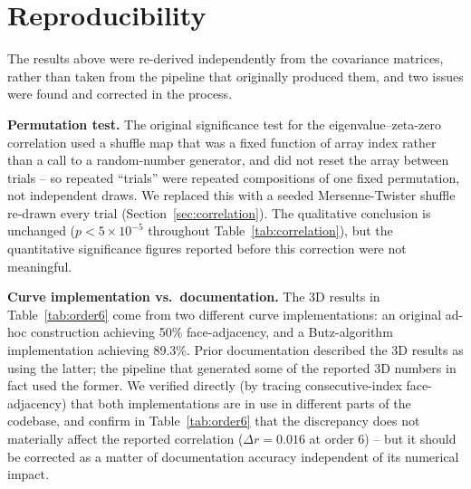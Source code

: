 \documentclass[11pt,a4paper]{article}
\begin{document}
\section{Reproducibility}
\label{sec:reproducibility}

The results above were re-derived independently from the covariance
matrices, rather than taken from the pipeline that originally produced
them, and two issues were found and corrected in the process.

\textbf{Permutation test.} The original significance test for the
eigenvalue--zeta-zero correlation used a shuffle map that was a fixed
function of array index rather than a call to a random-number generator,
and did not reset the array between trials -- so repeated ``trials'' were
repeated compositions of one fixed permutation, not independent draws.
We replaced this with a seeded Mersenne-Twister shuffle re-drawn every
trial (Section~\ref{sec:correlation}). The qualitative conclusion is
unchanged ($p<5\times10^{-5}$ throughout Table~\ref{tab:correlation}), but
the quantitative significance figures reported before this correction were
not meaningful.

\textbf{Curve implementation vs.\ documentation.} The 3D results in
Table~\ref{tab:order6} come from two different curve implementations: an
original ad-hoc construction achieving 50\% face-adjacency, and a
Butz-algorithm implementation achieving 89.3\%. Prior documentation
described the 3D results as using the latter; the pipeline that generated
some of the reported 3D numbers in fact used the former. We verified
directly (by tracing consecutive-index face-adjacency) that both
implementations are in use in different parts of the codebase, and confirm
in Table~\ref{tab:order6} that the discrepancy does not materially affect
the reported correlation ($\Delta r = 0.016$ at order 6) -- but it should
be corrected as a matter of documentation accuracy independent of its
numerical impact.
\end{document}
